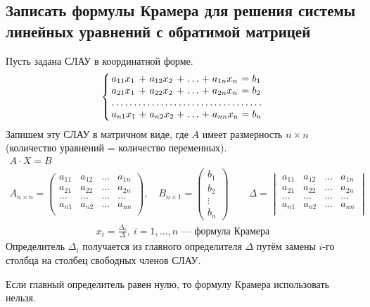 \subsection{Записать формулы Крамера для решения системы линейных уравнений с обратимой матрицей}
Пусть задана СЛАУ в координатной форме.
\begin{align*}
	\left\{
	{ \setlength{\arraycolsep}{1.5pt}
			\begin{array}{lllllllll}
                a_{11}x_1 & + & a_{12}x_2 & + & \ldots & + & a_{1n}x_n & = & b_1 \\
				a_{21}x_1 & + & a_{22}x_2 & + & \ldots & + & a_{2n}x_n & = & b_2 \\
				\hdotsfor{9}                                                     \\
				a_{n1}x_1 & + & a_{n2}x_2 & + & \ldots & + & a_{nn}x_n & = & b_n
			\end{array} } \right.
\end{align*}
Запишем эту СЛАУ в матричном виде, где $A$ имеет размерность $n\times n$ (количество уравнений = количество переменных). \vspace{-\topsep}
\begin{gather*}
	A \cdot X = B\\
	A_{n\times n} = \begin{pmatrix}
		a_{11} & a_{12} & \ldots & a_{1n} \\
		a_{21} & a_{22} & \ldots & a_{2n} \\
		\ldots & \ldots & \ldots & \ldots \\
		a_{n1} & a_{n2} & \ldots & a_{nn} \\
	\end{pmatrix}, \quad B_{n\times 1} = \begin{pmatrix}
		b_1    \\
		b_2    \\
		\vdots \\
		b_n
	\end{pmatrix}\qquad \Delta = \begin{vmatrix}
		a_{11} & a_{12} & \ldots & a_{1n} \\
		a_{21} & a_{22} & \ldots & a_{2n} \\
		\ldots & \ldots & \ldots & \ldots \\
		a_{n1} & a_{n2} & \ldots & a_{nn} \\
	\end{vmatrix}
\end{gather*}
\begin{gather*}
	\boxed{x_i = \frac{\Delta_i}{\Delta}},\ i = 1,\ldots,n \textbf{ --- формула Крамера}
\end{gather*}
Определитель $\Delta_i$ получается из главного определителя $\Delta$ путём замены $i$-го столбца на столбец свободных членов СЛАУ.
\begin{remark}
	Если главный определитель равен нулю, то формулу Крамера использовать нельзя.
\end{remark}


